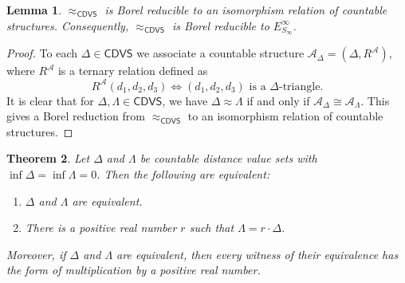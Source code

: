 \documentclass[10pt,a4paper]{amsart}
\newtheorem{theorem}{Theorem}[section]
\newtheorem{lemma}[theorem]{Lemma}
\theoremstyle{definition}
\theoremstyle{remark}
\begin{document}
\begin{lemma}\label{lem:isomorphism} $\approx_{\mathsf{CDVS}}$ is Borel reducible to an isomorphism relation of countable structures. Consequently, $\approx_{\mathsf{CDVS}}$ is Borel reducible to $E^\infty_{S_\infty}$.
\end{lemma}

\begin{proof} To each $\Delta\in \mathsf{CDVS}$ we associate a countable structure $\mathcal{A}_\Delta=(\Delta, R^{\mathcal{A}})$, where $R^{\mathcal{A}}$ is a ternary relation defined as
$$ R^{\mathcal{A}}(d_1,d_2,d_3)\iff \mbox{$(d_1,d_2,d_3)$ is a $\Delta$-triangle.}$$
It is clear that for $\Delta, \Lambda\in \mathsf{CDVS}$, we have $\Delta\approx \Lambda$ if and only if $\mathcal{A}_\Delta\cong \mathcal{A}_{\Lambda}$. This gives a Borel reduction from $\approx_{\mathsf{CDVS}}$ to an isomorphism relation of countable structures.
\end{proof}

 \begin{theorem}\label{thm:simapprox}
        Let $\Delta$ and $\Lambda$ be countable distance value sets with $\inf\Delta=\inf\Lambda=0$. Then the following are equivalent: 
        \begin{enumerate}
            \item[\rm (1)] $\Delta$ and $\Lambda$ are equivalent. 
            \item[\rm (2)] There is a positive real number $r$ such that $\Lambda = r \cdot \Delta$. 
        \end{enumerate} 

        Moreover, if $\Delta$ and $\Lambda$ are equivalent, then every witness of their equivalence has the form of multiplication by a positive real number. 
     \end{theorem}
\end{document}
